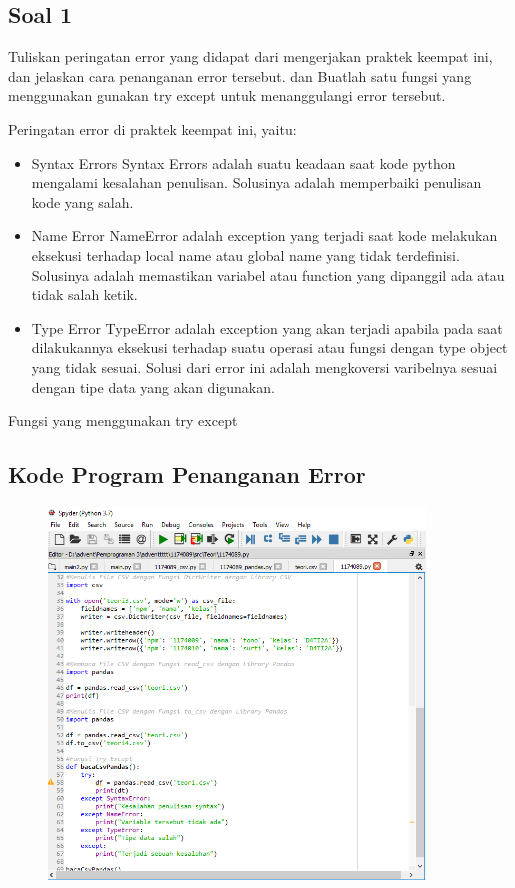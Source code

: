 \subsection{Soal 1}
Tuliskan  peringatan  error  yang  didapat  dari  mengerjakan  praktek  keempat  ini, dan  jelaskan  cara  penanganan  error  tersebut.   dan  Buatlah  satu  fungsi  yang menggunakan gunakan try except untuk menanggulangi error tersebut.

Peringatan error di praktek keempat ini, yaitu:
\begin{itemize}
	\item Syntax Errors
	Syntax Errors adalah suatu keadaan saat kode python mengalami kesalahan penulisan. Solusinya adalah memperbaiki penulisan kode yang salah.
	
	\item Name Error
	NameError adalah exception yang terjadi saat kode melakukan eksekusi terhadap local name atau global name yang tidak terdefinisi. Solusinya adalah memastikan variabel atau function yang dipanggil ada atau tidak salah ketik.
	
	\item Type Error
	TypeError adalah exception yang akan terjadi apabila pada saat dilakukannya eksekusi terhadap suatu operasi atau fungsi dengan type object yang tidak sesuai. Solusi dari error ini adalah mengkoversi varibelnya sesuai dengan tipe data yang akan digunakan.
\end{itemize}

Fungsi yang menggunakan try except


\subsection{Kode Program Penanganan Error}
\begin{figure}[H]
	\includegraphics[width=10cm]{figures/4/1174089/Praktek/p1.png}
	\centering
\end{figure}

